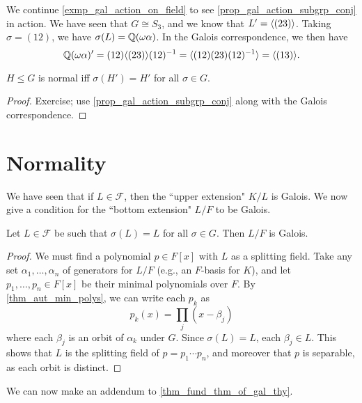 \begin{example}
    We continue \cref{exmp_gal_action_on_field} to see \cref{prop_gal_action_subgrp_conj} in action. We have seen that $G \cong S_3$, and we know that $L' = \langle {(23)} \rangle$. Taking $\sigma = (12)$, we have $\sigma(L) = \mathbb{{Q}}(\omega \alpha)$. In the Galois correspondence, we then have
    \[
        \mathbb{{Q}}(\omega \alpha)' = (12) \langle {(23)} \rangle (12)^{-1} = \langle {(12)(23)(12)^{-1}} \rangle = \langle {(13)} \rangle.
    \]
\end{example}

\begin{corollary}
\label{cor_normal_subgrp_of_gal_grp_iff}
    $H \leq G$ is normal iff $\sigma(H') = H'$ for all $\sigma \in G$.
\end{corollary}

\begin{proof}
    Exercise; use \cref{prop_gal_action_subgrp_conj} along with the Galois correspondence.
\end{proof}

\section{Normality}

We have seen that if $L \in \mathcal{F}$, then the ``upper extension" $K/L$ is Galois. We now give a condition for the ``bottom extension" $L/F$ to be Galois.

\begin{lemma}
\label{lem_cond_for_bottom_ext_gal}
    Let $L \in \mathcal{F}$ be such that $\sigma(L) = L$ for all $\sigma \in G$. Then $L/F$ is Galois.
\end{lemma}

\begin{proof}
    We must find a polynomial $p \in F[x]$ with $L$ as a splitting field. Take any set $\alpha_1, \ldots, \alpha_n$ of generators for $L/F$ (e.g., an $F$-basis for $K$), and let $p_1, \ldots, p_n \in F[x]$ be their minimal polynomials over $F$. By \cref{thm_aut_min_polys}, we can write each $p_k$ as
    \[
        p_k(x) = \prod_{j} (x - \beta_j)
    \]
    where each $\beta_j$ is an orbit of $\alpha_k$ under $G$. Since $\sigma(L) = L$, each $\beta_j \in L$. This shows that $L$ is the splitting field of $p = p_1 \cdots p_n$, and moreover that $p$ is separable, as each orbit is distinct.
\end{proof}

We can now make an addendum to \cref{thm_fund_thm_of_gal_thy}.

